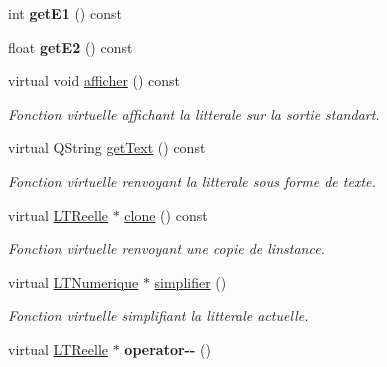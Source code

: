 \begin{DoxyCompactItemize}
\item 
int {\bfseries get\+E1} () const \hypertarget{class_l_t_reelle_aadc6331a7e20de9727f219f161c626a7}{}\label{class_l_t_reelle_aadc6331a7e20de9727f219f161c626a7}

\item 
float {\bfseries get\+E2} () const \hypertarget{class_l_t_reelle_a300d728fa9ca1fb3d1db086810339c21}{}\label{class_l_t_reelle_a300d728fa9ca1fb3d1db086810339c21}

\item 
virtual void \hyperlink{class_l_t_reelle_afed5ec07f74ea2ad2390d0dd11bee68f}{afficher} () const \hypertarget{class_l_t_reelle_afed5ec07f74ea2ad2390d0dd11bee68f}{}\label{class_l_t_reelle_afed5ec07f74ea2ad2390d0dd11bee68f}

\begin{DoxyCompactList}\small\item\em Fonction virtuelle affichant la litterale sur la sortie standart. \end{DoxyCompactList}\item 
virtual Q\+String \hyperlink{class_l_t_reelle_aa85d99c6c692e3fd51019630cfd88cc4}{get\+Text} () const 
\begin{DoxyCompactList}\small\item\em Fonction virtuelle renvoyant la litterale sous forme de texte. \end{DoxyCompactList}\item 
virtual \hyperlink{class_l_t_reelle}{L\+T\+Reelle} $\ast$ \hyperlink{class_l_t_reelle_a1dac7c02dfa84815730d5f0396ef1519}{clone} () const 
\begin{DoxyCompactList}\small\item\em Fonction virtuelle renvoyant une copie de l\textquotesingle{}instance. \end{DoxyCompactList}\item 
virtual \hyperlink{class_l_t_numerique}{L\+T\+Numerique} $\ast$ \hyperlink{class_l_t_reelle_aaaf23323d16d13b2ec7595c6aa07935f}{simplifier} ()
\begin{DoxyCompactList}\small\item\em Fonction virtuelle simplifiant la litterale actuelle. \end{DoxyCompactList}\item 
virtual \hyperlink{class_l_t_reelle}{L\+T\+Reelle} $\ast$ {\bfseries operator-\/-\/} ()\hypertarget{class_l_t_reelle_a8e72afe3c802aed84d10f7d32e794931}{}\label{class_l_t_reelle_a8e72afe3c802aed84d10f7d32e794931}


\end{DoxyCompactItemize}
